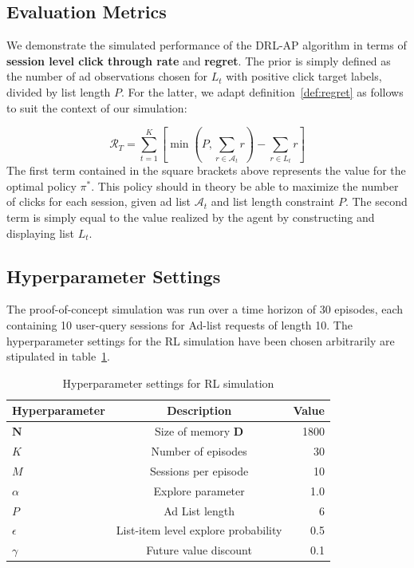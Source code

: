 \documentclass{mldsmsc}
\begin{document}
\subsection{Evaluation Metrics}

We demonstrate the simulated performance of the DRL-AP algorithm in terms of
\textbf{session level click through rate} and \textbf{regret}. The prior is simply
defined as the number of ad observations chosen for $L_t$ with positive click target
labels, divided by list length $P$. For the latter, we adapt definition~\ref{def:regret}
as follows to suit the context of our simulation:

\begin{equation}
    \label{eqn:sim-regret}
    \mathcal{R}_T = \sum_{t=1}^K \left[ \min(P, \sum_{r \in \mathcal{A}_t}r) - \sum_{r \in L_t}r\right]   
\end{equation}
The first term contained in the square brackets above represents the value for the
optimal policy $\pi^*$. This policy should in theory be able to maximize the number
of clicks for each session, given ad list $\mathcal{A}_t$ and list length constraint
$P$. The second term is simply equal to the value realized by the agent by constructing
and displaying list $L_t$.

\subsection{Hyperparameter Settings}

The proof-of-concept simulation was run over a time horizon of 30 episodes, each
containing 10 user-query sessions for Ad-list requests of length 10.
The hyperparameter settings for the RL simulation have been chosen arbitrarily
are stipulated in table~\ref{tab:rl-parameters}.

\begin{table}[h]
    \begin{tabular}{|l|c|r|}
        \hline
        \textbf{Hyperparameter} & \textbf{Description} & \textbf{Value}\\
        \hline
        $\mathbf{N}$ & Size of memory $\mathbf{D}$ & 1800 \\
        $K$ & Number of episodes & 30 \\
        $M$ & Sessions per episode & 10 \\
        $\alpha$ & Explore parameter & 1.0 \\
        $P$ & Ad List length & 6 \\
        $\epsilon$ & List-item level explore probability & 0.5\\
        $\gamma$ & Future value discount & 0.1\\
        \hline
    \end{tabular}
    \caption{Hyperparameter settings for RL simulation}
    \label{tab:rl-parameters}
\end{table}
\end{document}

